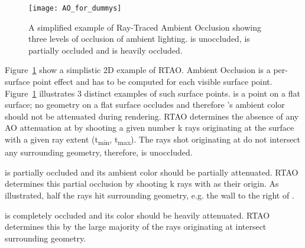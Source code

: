 \begin{figure}[htb]
  \centering
  \texttt{[image: AO\_for\_dummys]}
 
  \caption{\label{fig:RTAO_intro}
           A simplified example of Ray-Traced Ambient Occlusion showing three levels of occlusion of ambient lighting.  is unoccluded,  is partially occluded and  is heavily occluded.
           }
\end{figure}

Figure~\ref{fig:RTAO_intro} show a simplistic 2D example of RTAO. Ambient Occlusion is a per-surface point effect and has to be computed for each visible surface point. Figure~\ref{fig:RTAO_intro} illustrates 3 distinct examples of such surface points.
 is a point on a flat surface; no geometry on a flat surface occludes  and therefore 's ambient color should not be attenuated during rendering. RTAO determines the absence of any AO attenuation at  by shooting a given number k rays originating at the surface with a given ray extent (t\textsubscript{min}, t\textsubscript{max}). The rays shot originating at  do not intersect any surrounding geometry, therefore,  is unoccluded. 

 is partially occluded and its ambient color should be partially attenuated. RTAO determines this partial occlusion by shooting k rays with  as their origin. As illustrated, half the rays hit surrounding geometry, e.g. the wall to the right of .

 is completely occluded and its color should be heavily attenuated. RTAO determines this by the large majority of the rays originating at  intersect surrounding geometry.












